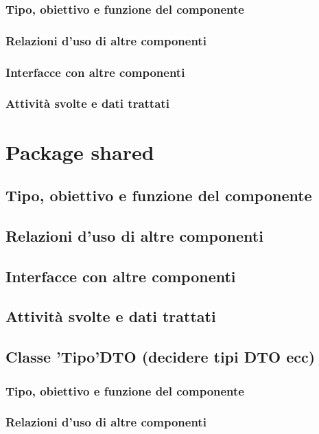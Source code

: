 \subsubsection*{Tipo, obiettivo e funzione del componente}
\subsubsection*{Relazioni d'uso di altre componenti}
\subsubsection*{Interfacce con altre componenti}
\subsubsection*{Attivit\`a svolte e dati trattati}

\newpage
\section{Package shared} %
\subsection*{Tipo, obiettivo e funzione del componente}
\subsection*{Relazioni d'uso di altre componenti}
\subsection*{Interfacce con altre componenti}
\subsection*{Attivit\`a svolte e dati trattati}

\subsection{Classe 'Tipo'DTO  (decidere tipi DTO ecc)}
\subsubsection*{Tipo, obiettivo e funzione del componente}
\subsubsection*{Relazioni d'uso di altre componenti}
